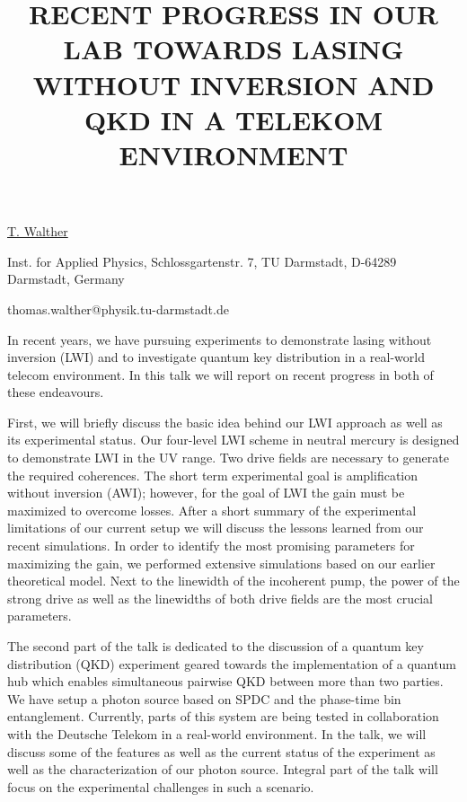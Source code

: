 \title{RECENT PROGRESS IN OUR LAB TOWARDS LASING WITHOUT INVERSION AND QKD IN A TELEKOM ENVIRONMENT}

\underline{T. Walther} 

{\normalsize{\vspace{-4mm}
Inst. for Applied Physics,
Schlossgartenstr. 7,
TU Darmstadt,
D-64289 Darmstadt,
Germany



\email thomas.walther@physik.tu-darmstadt.de}}


In recent years, we have pursuing experiments to demonstrate lasing without inversion (LWI) and to investigate quantum key distribution in a real-world telecom environment. In this talk we will report on recent progress in both of these endeavours.

First, we will briefly discuss the basic idea behind our LWI approach as well as its experimental status. Our four-level LWI scheme in neutral mercury is designed to demonstrate LWI in the UV range. Two drive fields are necessary to generate the required coherences. The short term experimental goal is amplification without inversion (AWI); however, for the goal of LWI the gain must be maximized to overcome losses. After a short summary of the experimental limitations of our current setup we will discuss the lessons learned from our recent simulations. In order to identify the most promising parameters for maximizing the gain, we performed extensive simulations based on our earlier theoretical model. Next to the linewidth of the incoherent pump, the power of the strong drive as well as the linewidths of both drive fields are the most crucial parameters.

The second part of the talk is dedicated to the discussion of a quantum key distribution (QKD) experiment geared towards the implementation of a quantum hub which enables simultaneous pairwise QKD between more than two parties. We have setup a photon source based on SPDC and the phase-time bin entanglement. Currently, parts of this system are being tested in collaboration with the Deutsche Telekom in a real-world environment. In the talk, we will discuss some of the features as well as the current status of the experiment as well as the characterization of our photon source. Integral part of the talk will focus on the experimental challenges in such a scenario.

\vspace{\baselineskip}